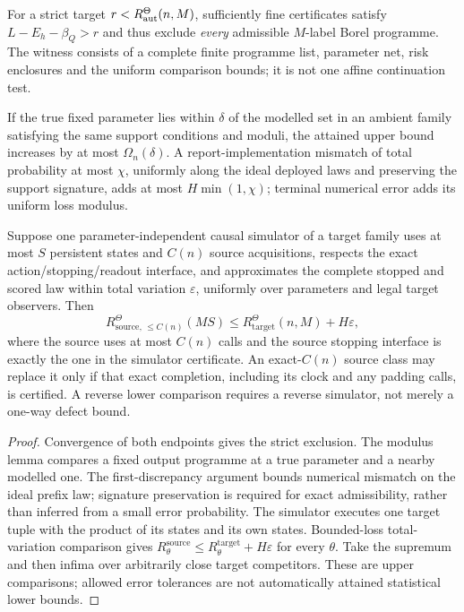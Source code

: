 \begin{corollary}\label{cor:uniform_transfer}
For a strict target $r<R^\Theta_{\mathrm{aut}}(n,M)$, sufficiently fine certificates satisfy $L-E_h-\beta_Q>r$ and thus exclude \emph{every} admissible $M$-label Borel programme. The witness consists of a complete finite programme list, parameter net, risk enclosures and the uniform comparison bounds; it is not one affine continuation test.

If the true fixed parameter lies within $\delta$ of the modelled set in an ambient family satisfying the same support conditions and moduli, the attained upper bound increases by at most $\Omega_n(\delta)$. A report-implementation mismatch of total probability at most $\chi$, uniformly along the ideal deployed laws and preserving the support signature, adds at most $H\min(1,\chi)$; terminal numerical error adds its uniform loss modulus.

Suppose one parameter-independent causal simulator of a target family uses at most $S$ persistent states and $C(n)$ source acquisitions, respects the exact action/stopping/readout interface, and approximates the complete stopped and scored law within total variation $\varepsilon$, uniformly over parameters and legal target observers. Then
\begin{equation}\label{eq:uniform_simulation}
 R^\Theta_{\mathrm{source},\,\le C(n)}(MS)
       \le R^\Theta_{\mathrm{target}}(n,M)+H\varepsilon,
\end{equation}
where the source uses at most $C(n)$ calls and the source stopping interface is exactly the one in the simulator certificate. An exact-$C(n)$ source class may replace it only if that exact completion, including its clock and any padding calls, is certified. A reverse lower comparison requires a reverse simulator, not merely a one-way defect bound.
\end{corollary}
\begin{proof}
Convergence of both endpoints gives the strict exclusion. The modulus lemma compares a fixed output programme at a true parameter and a nearby modelled one. The first-discrepancy argument bounds numerical mismatch on the ideal prefix law; signature preservation is required for exact admissibility, rather than inferred from a small error probability. The simulator executes one target tuple with the product of its states and its own states. Bounded-loss total-variation comparison gives $R_\theta^{\mathrm{source}}\le R_\theta^{\mathrm{target}}+H\varepsilon$ for every $\theta$. Take the supremum and then infima over arbitrarily close target competitors. These are upper comparisons; allowed error tolerances are not automatically attained statistical lower bounds.
\end{proof}

